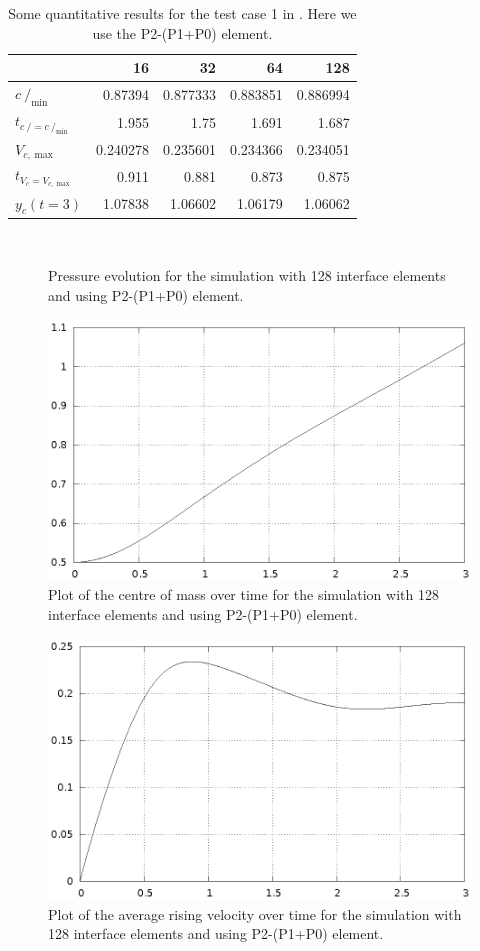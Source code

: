 \documentclass[a4paper,12pt,onecolumn]{article}
\newcommand{\strikec}{\mbox{$c\!\!\!\!\:/$}}
\begin{document}
\begin{table}
\center
\begin{tabular}{lrrrr}
\hline
& 16 & 32 & 64 & 128 \\
\hline
$\strikec_{\min}$ & 0.87394 & 0.877333 & 0.883851 & 0.886994 \\
$t_{\strikec = \strikec_{\min}}$ & 1.955 & 1.75 & 1.691 & 1.687 \\
$V_{c,\max}$ & 0.240278 & 0.235601 & 0.234366 & 0.234051 \\
$t_{V_c = V_{c,\max}}$ & 0.911 & 0.881 & 0.873 & 0.875 \\
$y_c(t=3)$ & 1.07838 & 1.06602 & 1.06179 & 1.06062 \\
\hline
\end{tabular}
\caption{Some quantitative results for the test case 1 in
\cite{HysingTKPBGT09}. Here we use the P2-(P1+P0) element.}
\label{tab:2d_benchmark1_P1P0}
\end{table}

\begin{figure}[htbp]
\centering
{}
 \\
\caption{Pressure evolution for the simulation with 128 interface elements and
using P2-(P1+P0) element.}
\label{fig:2d_benchmark1_pressure}
\end{figure}
\begin{figure}[htbp]
\centering
\includegraphics[width=.45\textwidth]
{figures/2d_benchmark1_barycenter_p1p0_128.ps}
\caption{Plot of the centre of mass over time for the simulation with 128
interface elements and using P2-(P1+P0) element.}
\label{fig:2d_benchmark1_barycenter}
\end{figure}

\begin{figure}[htbp]
\centering
\includegraphics[width=.45\textwidth]
{figures/2d_benchmark1_velocity_p1p0_128.ps}
\caption{Plot of the average rising velocity over time for the simulation
with 128 interface elements and using P2-(P1+P0) element.}
\label{fig:2d_benchmark1_velocity}
\end{figure}
\end{document}
